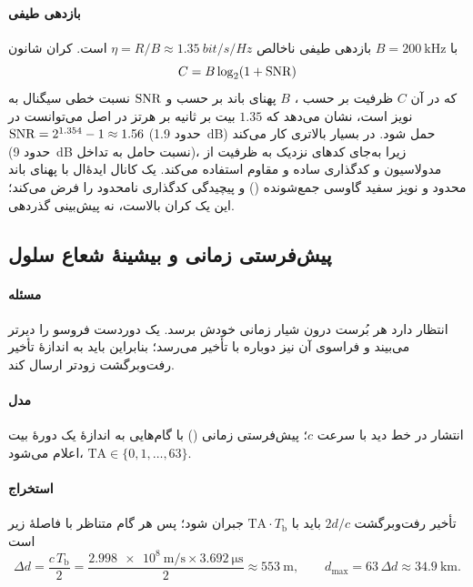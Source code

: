 \documentclass[11pt,a4paper]{article}
\begin{document}
\paragraph{بازدهی طیفی} با $B = \qty{200}{\kilo\hertz}$ بازدهی طیفی ناخالص
$\eta = R/B \approx \qty{1.35}{bit/s/Hz}$ است. کران شانون \cite{shannon1948mathematical}
\begin{equation}\label{eq:shannon}
  C = B\log_2\!\left(1+\mathrm{SNR}\right)
\end{equation}
که در آن $C$ ظرفیت بر حسب ، $B$ پهنای باند بر حسب  و $\mathrm{SNR}$ نسبت خطی
سیگنال به نویز است، نشان می‌دهد که $1.35$ بیت بر ثانیه بر هرتز در اصل می‌توانست در
$\mathrm{SNR} = 2^{1.354}-1 \approx 1.56$ (حدود \qty{1.9}{\dB}) حمل شود.  در 
بسیار بالاتری کار می‌کند (حدود \qty{9}{\dB} نسبت حامل به تداخل)، زیرا به‌جای کدهای
نزدیک به ظرفیت از مدولاسیون و کدگذاری ساده و مقاوم استفاده می‌کند.  یک
کانال ایدهٔ‌ال با پهنای باند محدود و نویز سفید گاوسی جمع‌شونده () و پیچیدگی
کدگذاری نامحدود را فرض می‌کند؛ این یک کران بالاست، نه پیش‌بینی گذردهی.

\subsection{پیش‌فرستی زمانی و بیشینهٔ شعاع سلول}
\paragraph{مسئله}  انتظار دارد هر بُرست درون شیار زمانی خودش برسد. یک 
دوردست فروسو را دیرتر می‌بیند و فراسوی آن نیز دوباره با تأخیر می‌رسد؛ بنابراین باید به
اندازهٔ تأخیر رفت‌وبرگشت زودتر ارسال کند.
\paragraph{مدل} انتشار در خط دید با سرعت $c$؛ پیش‌فرستی زمانی () با گام‌هایی به
اندازهٔ یک دورهٔ بیت اعلام می‌شود، $\mathrm{TA}\in\{0,1,\dots,63\}$.
\paragraph{استخراج} تأخیر رفت‌وبرگشت $2d/c$ باید با $\mathrm{TA}\cdot T_{\mathrm{b}}$ جبران
شود؛ پس هر گام  متناظر با فاصلهٔ زیر است
\begin{equation}\label{eq:tastep}
  \Delta d = \frac{c\,T_{\mathrm{b}}}{2} = \frac{\qty{2.998e8}{\metre\per\second}\times\qty{3.692}{\micro\second}}{2}
  \approx \qty{553}{\metre},
  \qquad d_{\max} = 63\,\Delta d \approx \qty{34.9}{\kilo\metre}.
\end{equation}
\end{document}
